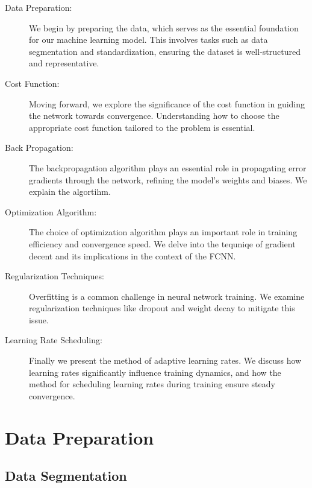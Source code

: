 \documentclass[a4paper, UKenglish, 11pt]{uiomaster}
\begin{document}
\begin{description}
   \item [Data Preparation:] We begin by preparing the data, which serves as the essential foundation for our machine learning model. This involves tasks such as data segmentation and standardization, ensuring the dataset is well-structured and representative.

   \item [Cost Function:] Moving forward, we explore the significance of the cost function in guiding the network towards convergence. Understanding how to choose the appropriate cost function tailored to the problem is essential.

   \item[Back Propagation:] The backpropagation algorithm plays an essential role in propagating error gradients through the network, refining the model's weights and biases. We explain the algortihm.

   \item[Optimization Algorithm:] The choice of optimization algorithm plays an important role in training efficiency and convergence speed. We delve into the tequniqe of gradient decent and its implications in the context of the FCNN.

   \item[Regularization Techniques:] Overfitting is a common challenge in neural network training. We examine regularization techniques like dropout and weight decay to mitigate this issue.

   \item[Learning Rate Scheduling:] Finally we present the method of adaptive learning rates. We discuss how learning rates significantly influence training dynamics, and how the method for scheduling learning rates during training ensure steady convergence.

\end{description}

\section{Data Preparation}
\subsection{Data Segmentation}
\end{document}
